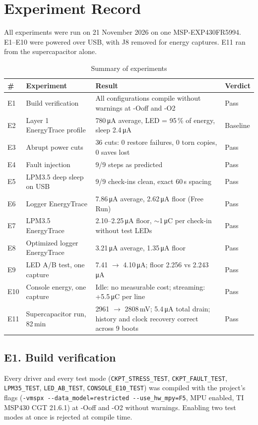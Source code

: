\documentclass[conference]{IEEEtran}
\newcommand{\uA}{\,\si{\micro\ampere}}
\newcommand{\uC}{\,\si{\micro\coulomb}}
\newcommand{\code}[1]{\texttt{#1}}
\begin{document}
\section{Experiment Record}

All experiments were run on 21 November 2026 on one MSP-EXP430FR5994. E1--E10 were powered over USB, with J8 removed for energy captures. E11 ran from the supercapacitor alone.

\begin{table}[H]
\centering\small
\caption{Summary of experiments}
\begin{tabularx}{\textwidth}{@{}llLl@{}}
\toprule
\# & Experiment & Result & Verdict \\
\midrule
E1 & Build verification & All configurations compile without warnings at -Ooff and -O2 & Pass \\
E2 & Layer 1 EnergyTrace profile & 780\uA{} average, LED = 95\,\% of energy, sleep 2.4\uA & Baseline \\
E3 & Abrupt power cuts & 36 cuts: 0 restore failures, 0 torn copies, 0 saves lost & Pass \\
E4 & Fault injection & 9/9 steps as predicted & Pass \\
E5 & LPM3.5 deep sleep on USB & 9/9 check-ins clean, exact 60\,s spacing & Pass \\
E6 & Logger EnergyTrace & 7.86\uA{} average, 2.62\uA{} floor (Free Run) & Pass \\
E7 & LPM3.5 EnergyTrace & 2.10--2.25\uA{} floor, $\sim$1\uC{} per check-in without test LEDs & Pass \\
E8 & Optimized logger EnergyTrace & 3.21\uA{} average, 1.35\uA{} floor & Pass \\
E9 & LED A/B test, one capture & 7.41 $\rightarrow$ 4.10\uA; floor 2.256 vs 2.243\uA & Pass \\
E10 & Console energy, one capture & Idle: no measurable cost; streaming: +5.5\uC{} per line & Pass \\
E11 & Supercapacitor run, 82\,min & 2961 $\rightarrow$ 2808\,mV; 5.4\uA{} total drain; history and clock recovery correct across 9 boots & Pass \\
\bottomrule
\end{tabularx}
\end{table}

\subsection*{E1. Build verification}
Every driver and every test mode (\code{CKPT\_STRESS\_TEST}, \code{CKPT\_FAULT\_TEST}, \code{LPM35\_TEST}, \code{LED\_AB\_TEST}, \code{CONSOLE\_E10\_TEST}) was compiled with the project's flags (\code{-vmspx -{}-data\_model=restricted -{}-use\_hw\_mpy=F5}, MPU enabled, TI MSP430 CGT 21.6.1) at -Ooff and -O2 without warnings. Enabling two test modes at once is rejected at compile time.
\end{document}
